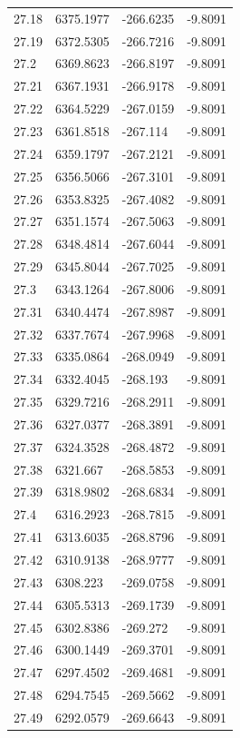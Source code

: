 \begin{table}[H]
\begin{tabular}{llll}
27.18 & 6375.1977 & -266.6235 & -9.8091 \\
27.19 & 6372.5305 & -266.7216 & -9.8091 \\
27.2 & 6369.8623 & -266.8197 & -9.8091 \\
27.21 & 6367.1931 & -266.9178 & -9.8091 \\
27.22 & 6364.5229 & -267.0159 & -9.8091 \\
27.23 & 6361.8518 & -267.114 & -9.8091 \\
27.24 & 6359.1797 & -267.2121 & -9.8091 \\
27.25 & 6356.5066 & -267.3101 & -9.8091 \\
27.26 & 6353.8325 & -267.4082 & -9.8091 \\
27.27 & 6351.1574 & -267.5063 & -9.8091 \\
27.28 & 6348.4814 & -267.6044 & -9.8091 \\
27.29 & 6345.8044 & -267.7025 & -9.8091 \\
27.3 & 6343.1264 & -267.8006 & -9.8091 \\
27.31 & 6340.4474 & -267.8987 & -9.8091 \\
27.32 & 6337.7674 & -267.9968 & -9.8091 \\
27.33 & 6335.0864 & -268.0949 & -9.8091 \\
27.34 & 6332.4045 & -268.193 & -9.8091 \\
27.35 & 6329.7216 & -268.2911 & -9.8091 \\
27.36 & 6327.0377 & -268.3891 & -9.8091 \\
27.37 & 6324.3528 & -268.4872 & -9.8091 \\
27.38 & 6321.667 & -268.5853 & -9.8091 \\
27.39 & 6318.9802 & -268.6834 & -9.8091 \\
27.4 & 6316.2923 & -268.7815 & -9.8091 \\
27.41 & 6313.6035 & -268.8796 & -9.8091 \\
27.42 & 6310.9138 & -268.9777 & -9.8091 \\
27.43 & 6308.223 & -269.0758 & -9.8091 \\
27.44 & 6305.5313 & -269.1739 & -9.8091 \\
27.45 & 6302.8386 & -269.272 & -9.8091 \\
27.46 & 6300.1449 & -269.3701 & -9.8091 \\
27.47 & 6297.4502 & -269.4681 & -9.8091 \\
27.48 & 6294.7545 & -269.5662 & -9.8091 \\
27.49 & 6292.0579 & -269.6643 & -9.8091 \\

\end{tabular}
\end{table}
